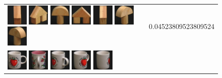 \begin{figure}[!p]
\begin{center}
\begin{tabular}{m{11cm} | m{3cm} |}
\includegraphics[width=1cm]{coil/beeld-44.eps}
\includegraphics[width=1cm]{coil/beeld-45.eps}
\includegraphics[width=1cm]{coil/beeld-1.eps}
\includegraphics[width=1cm]{coil/beeld-43.eps}
\includegraphics[width=1cm]{coil/beeld-47.eps}
\includegraphics[width=1cm]{coil/beeld-3.eps}
\includegraphics[width=1cm]{coil/beeld-4.eps}
& {\scriptsize 0.04523809523809524}
\\
\includegraphics[width=1cm]{coil/beeld-36.eps}
\includegraphics[width=1cm]{coil/beeld-11.eps}
\includegraphics[width=1cm]{coil/beeld-40.eps}
\includegraphics[width=1cm]{coil/beeld-39.eps}
\includegraphics[width=1cm]{coil/beeld-38.eps}

\end{tabular}
\end{center}
\end{figure}
